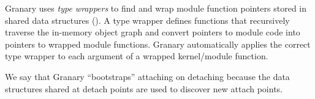 \documentclass[letterpaper,twocolumn,10pt]{article}
\begin{document}
Granary uses \emph{type wrappers} to find and wrap module function pointers stored in shared data structures (). A type wrapper defines functions that recursively  traverse the in-memory object graph and convert pointers to module code into pointers to wrapped module functions.  Granary automatically applies the correct type wrapper to each argument of a wrapped kernel/module function. 

We say that Granary ``bootstraps'' attaching on detaching because the data structures shared at detach points are used to discover new attach points.

\end{document}
